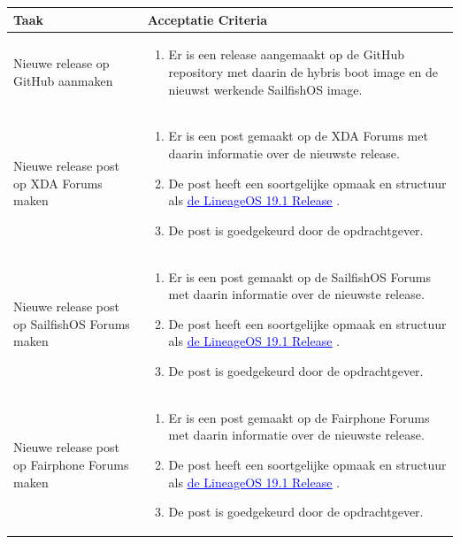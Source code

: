 \documentclass[a4paper]{report}
\newcommand{\styledhref}[2]{%
    \href{#1}{\textcolor{blue}{\underline{#2}}} %
}
\newcommand{\userstorycolor}{PeachPuff1}
\begin{document}
\begin{tcolorbox}[colback=white, coltitle=black, colframe=\userstorycolor, title=\textbf{User Story: }Als opdrachtgever wil ik dat er altijd een actieve sailfishOS build beschikbaar is\, zodat gebruikers de laatste functionaliteiten kunnen gebruiken.]
\begin{table}[H]
    \centering
  \begin{tabularx}{1\textwidth}{|X|X|}
    \hline
    \cellcolor[HTML]{ffcc99} \textbf{Taak} & \cellcolor[HTML]{ffcc99} \textbf{Acceptatie Criteria} \\ 
    \hline
    Nieuwe release op GitHub aanmaken &
     \begin{enumerate}
      \item Er is een release aangemaakt op de GitHub repository met daarin de hybris boot image en de nieuwst werkende SailfishOS image.
     \end{enumerate}
      \\
    \hline 
    Nieuwe release post op XDA Forums maken & 
    \begin{enumerate}
      \item Er is een post gemaakt op de XDA Forums met daarin informatie over de nieuwste release.
      \item De post heeft een soortgelijke opmaak en structuur als \styledhref{https://xdaforums.com/t/lineageos-19-1-android-12l-signature-spoofing-ota-updates-for-s8-s8-note8.4370375/}{de LineageOS 19.1 Release}.
      \item De post is goedgekeurd door de opdrachtgever.
     \end{enumerate}
    \\ 
    \hline 
    Nieuwe release post op SailfishOS Forums maken & 
    \begin{enumerate}
      \item Er is een post gemaakt op de SailfishOS Forums met daarin informatie over de nieuwste release.
      \item De post heeft een soortgelijke opmaak en structuur als \styledhref{https://xdaforums.com/t/lineageos-19-1-android-12l-signature-spoofing-ota-updates-for-s8-s8-note8.4370375/}{de LineageOS 19.1 Release}.
      \item De post is goedgekeurd door de opdrachtgever.
     \end{enumerate}
    \\ 
    \hline 
    Nieuwe release post op Fairphone Forums maken & 
    \begin{enumerate}
      \item Er is een post gemaakt op de Fairphone Forums met daarin informatie over de nieuwste release.
      \item De post heeft een soortgelijke opmaak en structuur als \styledhref{https://xdaforums.com/t/lineageos-19-1-android-12l-signature-spoofing-ota-updates-for-s8-s8-note8.4370375/}{de LineageOS 19.1 Release}.
      \item De post is goedgekeurd door de opdrachtgever.
     \end{enumerate}
    \\ 
    \hline 
        

\end{tabularx}
\end{table}
\end{tcolorbox}
\end{document}
